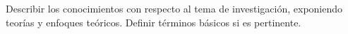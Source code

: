 Describir los conocimientos con respecto al tema de investigación, exponiendo teorías y enfoques teóricos. Definir términos básicos si es pertinente. 